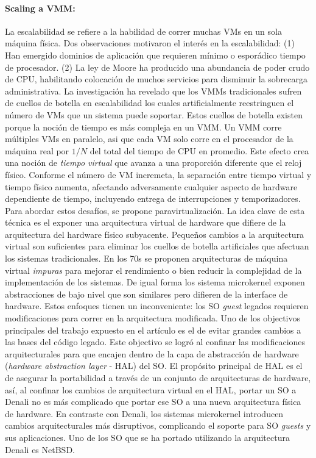 \paragraph{\textnormal{\textbf{Scaling a VMM:}}}  
La escalabilidad se refiere a la habilidad de correr muchas VMs en un sola máquina física. Dos observaciones motivaron el interés en la escalabilidad: (1) Han emergido dominios de aplicación que requieren mínimo o esporádico tiempo de procesador. (2) La ley de Moore ha producido una abundancia de poder crudo de CPU, habilitando colocación de muchos servicios para disminuir la sobrecarga administrativa. La investigación ha revelado que los VMMs tradicionales sufren de cuellos de botella en escalabilidad los cuales artificialmente reestringuen el número de VMs que un sistema puede soportar. Estos cuellos de botella existen porque la noción de tiempo es más compleja en un VMM. Un VMM corre múltiples VMs en paralelo, asi que cada VM solo corre en el procesador de la máquina real por $1/N$ del total del tiempo de CPU en promedio. Este efecto crea una noción de \emph{tiempo virtual} que avanza a una proporción diferente que el reloj físico. Conforme el número de VM incremeta, la separación entre tiempo virtual y tiempo físico aumenta, afectando adversamente cualquier aspecto de hardware dependiente de tiempo, incluyendo entrega de interrupciones y temporizadores. Para abordar estos desafíos, se propone paravirtualización. La idea clave de esta técnica es el exponer una arquitectura virtual de hardware que difiere de la arquitectura del hardware físico subyacente. Pequeños cambios a la arquitectura virtual son suficientes para eliminar los cuellos de botella artificiales que afectuan los sistemas tradicionales. En los 70s se proponen arquitecturas de máquina virtual \emph{impuras} para mejorar el rendimiento o bien reducir la complejidad de la implementación de los sistemas. De igual forma los sistema microkernel exponen abstracciones de bajo nivel que son similares pero difieren de la interface de hardware. Estos enfoques tienen un inconveniente: los SO \emph{guest} legados requieren modificaciones para correr en la arquitectura modificada. Uno de los objectivos principales del trabajo expuesto en el artículo es el de evitar grandes cambios a las bases del código legado. Este objectivo se logró al confinar las modificaciones arquitecturales para que encajen dentro de la capa de abstracción de hardware (\emph{hardware abstraction layer} - HAL) del SO. El propósito principal de HAL es el de asegurar la portabilidad a través de un conjunto de arquitecturas de hardware, así, al confinar los cambios de arquitectura virtual en el HAL, portar un SO a Denali no es más complicado que portar ese SO a una nueva arquitectura física de hardware. En contraste con Denali, los sistemas microkernel introducen cambios arquitecturales más disruptivos, complicando el soporte para SO \emph{guests} y sus aplicaciones. Uno de los SO que se ha portado utilizando la arquitectura Denali es NetBSD. 

